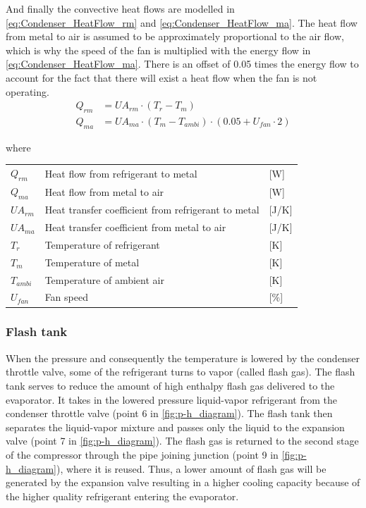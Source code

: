 \medskip
And finally the convective heat flows are modelled in \cref{eq:Condenser_HeatFlow_rm} and \cref{eq:Condenser_HeatFlow_ma}. The heat flow from metal to air is assumed to be approximately proportional to the air flow, which is why the speed of the fan is multiplied with the energy flow in \cref{eq:Condenser_HeatFlow_ma}. There is an offset of 0.05 times the energy flow to account for the fact that there will exist a heat flow when the fan is not operating.
\begin{align}
	Q_{rm}	 			& = U A_{rm} \cdot (T_r - T_m)							\label{eq:Condenser_HeatFlow_rm}\\
	Q_{ma}	 			& = U A_{ma} \cdot (T_m - T_{ambi})\cdot (0.05 + U_{fan} \cdot 2)				\label{eq:Condenser_HeatFlow_ma}
\end{align}

where
\smallskip
\begin{center}
	\begin{tabular}{l p{8cm} l}
		$Q_{rm}$				&	Heat flow from refrigerant to metal					& [\si{W}] \\
		$Q_{ma}$				&	Heat flow from metal to air								& [\si{W}] \\
		$U A_{rm}$				& 	Heat transfer coefficient from refrigerant to metal 	& [\si{J}/\si{K}] \\
		$U A_{ma}$				& 	Heat transfer coefficient from metal to air				& [\si{J}/\si{K}] \\
		$T_r$					& 	Temperature of refrigerant 							& [\si{K}] \\
		$T_m$					&	Temperature of metal 									& [\si{K}] \\
		$T_{ambi}$				&	Temperature of ambient air 								& [\si{K}] \\
		$U_{fan}$				&	Fan speed												& [$\%$] \\
	\end{tabular}
\end{center}


\subsubsection{Flash tank}\label{sec:componentModel_flash-tank}
When the pressure and consequently the temperature is lowered by the condenser throttle valve, some of the refrigerant turns to vapor (called flash gas). The flash tank serves to reduce the amount of high enthalpy flash gas delivered to the evaporator. It takes in the lowered pressure liquid-vapor refrigerant from the condenser throttle valve (point 6 in \cref{fig:p-h_diagram}). The flash tank then separates the liquid-vapor mixture and passes only the liquid to the expansion valve (point 7 in \cref{fig:p-h_diagram}). The flash gas is returned to the second stage of the compressor through the pipe joining junction (point 9 in \cref{fig:p-h_diagram}), where it is reused. Thus, a lower amount of flash gas will be generated by the expansion valve resulting in a higher cooling capacity because of the higher quality refrigerant entering the evaporator.

